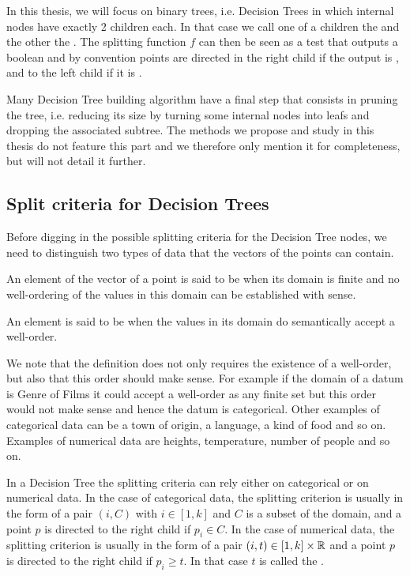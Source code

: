 In this thesis, we will focus on binary trees, i.e. Decision Trees in which internal nodes have exactly 2 children each. In that case we call one of a children the  and the other the . The splitting function $f$ can then be seen as a test that outputs a boolean and by convention points are directed in the right child if the output is \codetrue, and to the left child if it is \codefalse.

Many Decision Tree building algorithm have a final step that consists in pruning the tree, i.e. reducing its size by turning some internal nodes into leafs and dropping the associated subtree. The methods we propose and study in this thesis do not feature this part and we therefore only mention it for completeness, but will not detail it further.

\subsection{Split criteria for Decision Trees} \label{subsec:intro_dt_split_criteria}
Before digging in the possible splitting criteria for the Decision Tree nodes, we need to distinguish two types of data that the vectors of the points can contain.
\begin{definition}
    An element of the vector of a point is said to be  when its domain is finite and no well-ordering of the values in this domain can be established with sense.

    An element is said to be  when the values in its domain do semantically accept a well-order.
\end{definition}

We note that the definition does not only requires the existence of a well-order, but also that this order should make sense. For example if the domain of a datum is Genre of Films it could accept a well-order as any finite set but this order would not make sense and hence the datum is categorical. Other examples of categorical data can be a town of origin, a language, a kind of food and so on. Examples of numerical data are heights, temperature, number of people and so on.

In a Decision Tree the splitting criteria can rely either on categorical or on numerical data. In the case of categorical data, the splitting criterion is usually in the form of a pair $(i, C)$ with $i\in [1, k]$ and $C$ is a subset of the domain, and a point $p$ is directed to the right child if $p_i \in C$. In the case of numerical data, the splitting criterion is usually in the form of a pair $(i, t) \in [1, k]\times \mathbb{R}$ and a point $p$ is directed to the right child if $p_i \geq t$. In that case $t$ is called the .

